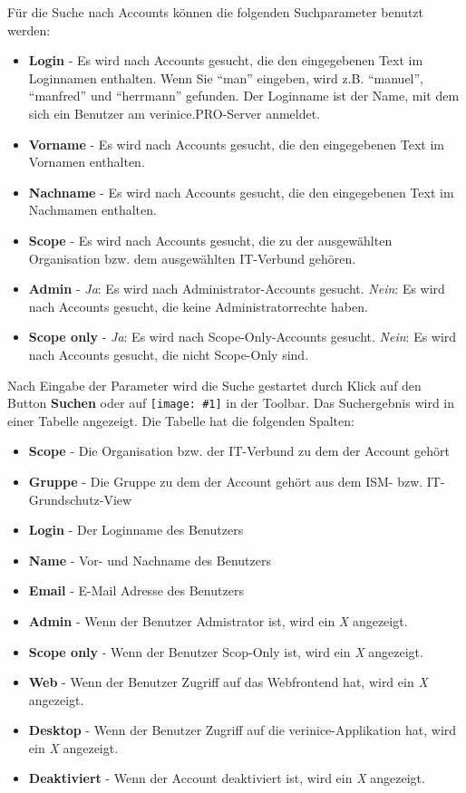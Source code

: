 \documentclass[a4paper,10pt]{book}
\newcommand{\icon}[1]{\texttt{[image: \#1]}}
\begin{document}
Für die Suche nach Accounts können die folgenden Suchparameter benutzt werden:
\begin{itemize}
\item \textbf{Login} - Es wird nach Accounts gesucht, die den eingegebenen Text
im Loginnamen enthalten. Wenn Sie ``man'' eingeben, wird z.B. ``manuel'',
``manfred'' und ``herrmann'' gefunden. Der Loginname ist der Name, mit dem sich
ein Benutzer am verinice.\textsc{PRO}-Server anmeldet.
\item \textbf{Vorname} - Es wird nach Accounts gesucht, die den eingegebenen
Text im Vornamen enthalten.
\item \textbf{Nachname} - Es wird nach Accounts gesucht, die den eingegebenen
Text im Nachmamen enthalten.
\item \textbf{Scope} - Es wird nach Accounts gesucht, die zu der ausgewählten
Organisation bzw. dem ausgewählten IT-Verbund gehören.
\item \textbf{Admin} - \textit{Ja}: Es wird nach Administrator-Accounts gesucht.
\textit{Nein}: Es wird nach Accounts gesucht, die keine Administratorrechte
haben.
\item \textbf{Scope only} - \textit{Ja}: Es wird nach Scope-Only-Accounts
gesucht. \textit{Nein}: Es wird nach Accounts gesucht, die nicht Scope-Only
sind.
\end{itemize}

Nach Eingabe der Parameter wird die Suche gestartet durch Klick auf den Button \textbf{Suchen} oder auf \icon{Icon/search.png} in der Toolbar. Das Suchergebnis wird in einer Tabelle angezeigt. Die Tabelle hat die folgenden Spalten:
\begin{itemize}
\item \textbf{Scope} - Die Organisation bzw. der IT-Verbund zu dem der Account gehört
\item \textbf{Gruppe} - Die Gruppe zu dem der Account gehört aus dem ISM- bzw. IT-Grundschutz-View
\item \textbf{Login} - Der Loginname des Benutzers
\item \textbf{Name} - Vor- und Nachname des Benutzers
\item \textbf{Email} - E-Mail Adresse des Benutzers
\item \textbf{Admin} - Wenn der Benutzer Admistrator ist, wird ein \textit{X} angezeigt.
\item \textbf{Scope only} - Wenn der Benutzer Scop-Only ist, wird ein \textit{X} angezeigt.
\item \textbf{Web} - Wenn der Benutzer Zugriff auf das Webfrontend hat, wird ein \textit{X} angezeigt.
\item \textbf{Desktop} - Wenn der Benutzer Zugriff auf die verinice-Applikation hat, wird ein \textit{X} angezeigt.
\item \textbf{Deaktiviert} - Wenn der Account deaktiviert ist, wird ein \textit{X} angezeigt.
\end{itemize}
\end{document}
